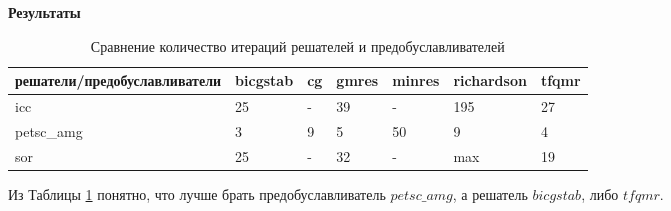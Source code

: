 \documentclass[11pt]{article}
\begin{document}
\Large\textbf{Результаты}



\begin{table}[ht!]
\centering
\caption{Сравнение количество итераций решателей и предобуславливателей}
\begin{tabular}{|lllllll|}
 \hline
  решатели/предобуславливатели         & bicgstab & cg & gmres & minres & richardson & tfqmr \\
 \hline
icc        &      25   &  -  &    39   &   -     &      195      & 27      \\
petsc\_amg &      3   &  9  &    5   &     50   &        9    &   4    \\
sor        &      25    &  -  &   32    &    -    &       max     & 19    \\[1ex] 
 \hline
\end{tabular}
\label{table:1}
\end{table}
Из Таблицы \ref{table:1} понятно, что лучше брать предобуславливатель $petsc\_amg$, а решатель $bicgstab$, либо $tfqmr$.
      \noindent{}
      
      \noindent{}
      
      \noindent{}
\end{document}
